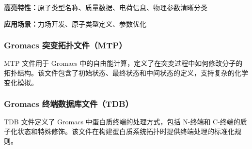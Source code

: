 \textbf{高亮特性：}原子类型名称、质量数据、电荷信息、物理参数清晰分类

\textbf{应用场景：}力场开发、原子类型定义、参数优化

\subsubsection{Gromacs 突变拓扑文件（MTP）}

MTP 文件用于 Gromacs 中的自由能计算，定义了在突变过程中如何修改分子的拓扑结构。该文件包含了初始状态、最终状态和中间状态的定义，支持复杂的化学变化模拟。

\subsubsection{Gromacs 终端数据库文件（TDB）}

TDB 文件定义了 Gromacs 中蛋白质终端的处理方式，包括 N-终端和 C-终端的质子化状态和特殊修饰。该文件在构建蛋白质系统拓扑时提供终端处理的标准化规则。

